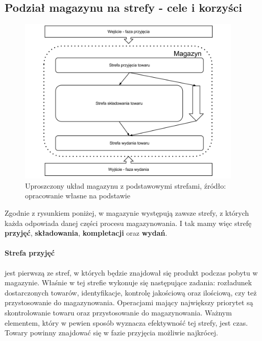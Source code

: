 	\subsection{Podział magazynu na strefy - cele i korzyści}
		\begin{figure}[h]
			\label{c4:warehouse_simple_schema}
			\begin{center}
				\includegraphics[width=0.95\textwidth]{images/warehouse_simple_schema}
			\end{center}
			\caption[Obszary magazynu - układ uproszczony]{
				Uproszczony układ magazynu z podstawowymi strefami, źródło: opracowanie własne na podstawie \cite{systemyLogistyczne_pfohl}
			}
		\end{figure}
		Zgodnie z rysunkiem poniżej, w magazynie występują zawsze strefy, z których każda odpowiada danej
		części procesu magazynowania. I tak mamy więc strefę \textbf{przyjęć}, \textbf{składowania}, \textbf{kompletacji} oraz \textbf{wydań}.
		
		\paragraph{Strefa przyjęć} jest pierwszą ze stref, w których będzie znajdował się produkt podczas pobytu w magazynie. 
		Właśnie w tej strefie wykonuje się następujące zadania: rozładunek dostarczonych towarów, identyfikacje, kontrolę jakościową
		oraz ilościową, czy też przystosowanie do magazynowania. Operacjami mający największy priorytet są skontrolowanie
		towaru oraz przystosowanie do magazynowania. Ważnym elementem, który w pewien sposób wyznacza efektywność tej strefy, jest
		czas. Towary powinny znajdować się w fazie przyjęcia możliwie najkrócej.
